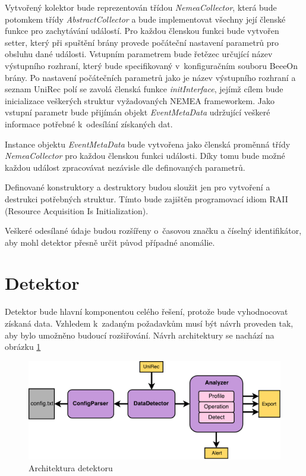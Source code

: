  Vytvořený kolektor bude reprezentován třídou \textit{NemeaCollector}, která bude potomkem třídy
 \textit{AbstractCollector} a bude implementovat všechny její členské funkce pro zachytávání událostí. Pro každou 
 členskou funkci  bude vytvořen setter, který při spuštění brány provede počáteční nastavení
 parametrů pro obsluhu dané 
 události. Vstupním parametrem bude řetězec určující název výstupního rozhraní, který bude
 specifikovaný
v~konfiguračním souboru BeeeOn brány. Po nastavení počátečních parametrů jako je název výstupního
 rozhraní a seznam UniRec polí se zavolá členská funkce \textit{initInterface}, jejímž cílem bude inicializace
 veškerých struktur vyžadovaných NEMEA frameworkem.
 Jako vstupní parametr bude přijímán objekt \textit{EventMetaData} udržující veškeré informace potřebné 
 k~odesílání získaných dat.
 
 Instance objektu \textit{EventMetaData} bude vytvořena jako členská proměnná třídy \textit{NemeaCollector}
 pro každou členskou funkci události. Díky tomu bude možné každou událost zpracovávat nezávisle dle
 definovaných parametrů.
 
 Definované konstruktory a destruktory budou sloužit jen pro vytvoření a destrukci potřebných 
 struktur. Tímto bude zajištěn programovací idiom RAII (Resource Acquisition Is Initialization).
 
 Veškeré odesílané údaje budou rozšířeny o~časovou značku a číselný identifikátor, aby mohl detektor
 přesně určit původ případné anomálie.
 
 \newpage
 \section{Detektor}
 Detektor bude hlavní komponentou celého řešení, protože bude vyhodnocovat získaná data. Vzhledem
 k~zadaným požadavkům musí být návrh proveden tak, aby bylo umožněno budoucí rozšiřování. Návrh 
 architektury se nachází na obrázku \ref{obr.detektor}
 \begin{figure}[ht]
   \begin{center}
   \includegraphics[scale=0.5]{pictures/detektor-arch}
   \caption{Architektura detektoru}
   \label{obr.detektor}
   \end{center}
   \end{figure}


